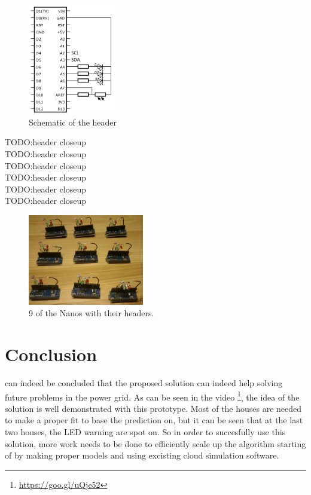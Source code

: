 \documentclass[a4paper,journal]{DDREAM}
\begin{document}
\begin{figure}[H]
\centering
    \includegraphics[width=0.35\textwidth]{./resources/schematic.png}
    \caption{Schematic of the header}
    \label{fig:schematic}
\end{figure}

TODO:header closeup \\
TODO:header closeup \\
TODO:header closeup \\
TODO:header closeup \\
TODO:header closeup \\
TODO:header closeup \\


\begin{figure}[H]
\centering
    \includegraphics[width=0.45\textwidth]{./resources/nanos.jpg}
    \caption{9 of the Nanos with their headers.}
    \label{fig:nanos}
\end{figure}

\section{Conclusion}\label{sec:conclusion}
 can indeed be concluded that the proposed solution can indeed help solving future problems in the power grid.
As can be seen in the video \footnote{\url{https://goo.gl/uQje52}}, the idea of the solution is well demonstrated with this prototype.
Most of the houses are needed to make a proper fit to base the prediction on, but it can be seen that at the last two houses, the LED warning are spot on.
So in order to succesfully use this solution, more work needs to be done to efficiently scale up the algorithm starting of by making proper models and using excisting cloud simulation software.
\end{document}
